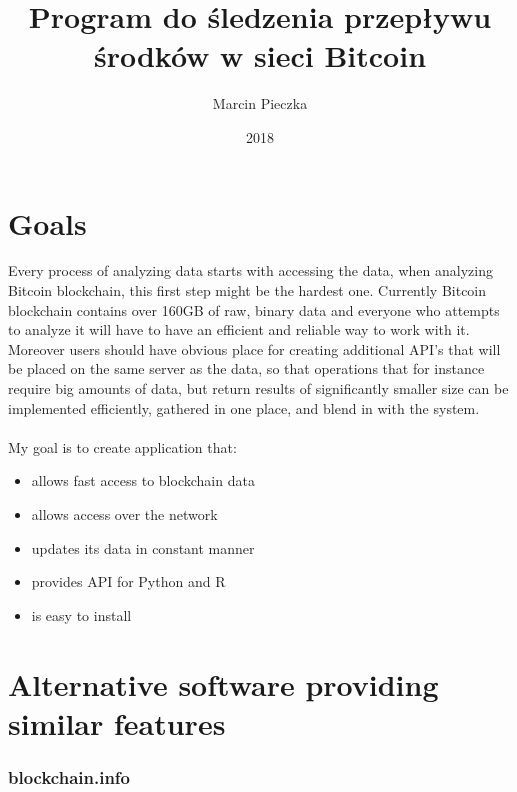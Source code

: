 \documentclass[12pt, en, eng]{mgr}
\begin{document}
\title{Program do śledzenia przepływu środków w sieci Bitcoin}
\date{2018}
\author{Marcin Pieczka}
\maketitle

\section{Goals}
Every process of analyzing data starts with accessing the data, when analyzing Bitcoin blockchain, this first step might be the hardest one. Currently Bitcoin blockchain contains over 160GB of raw, binary data and everyone who attempts to analyze it will have to have an efficient and reliable way to work with it. Moreover users should have obvious place for creating additional API's that will be placed on the same server as the data, so that operations that for instance require big amounts of data, but return results of significantly smaller size can be implemented efficiently, gathered in one place, and blend in with the system. 
\\
\\
My goal is to create application that: 
\begin{itemize}

\item
allows fast access to blockchain data
\item
allows access over the network
\item
updates its data in constant manner
\item
provides API for Python and R
\item
is easy to install

\end{itemize}

\section{Alternative software providing similar features}
\subsubsection*{blockchain.info}
\end{document}
